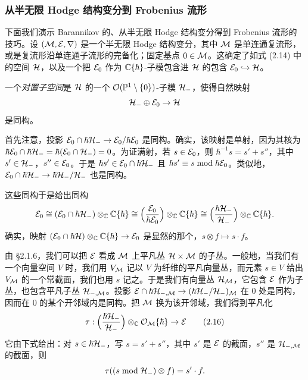 \subsubsection{从半无限 Hodge 结构变分到 Frobenius 流形}

下面我们演示 Barannikov 的、从半无限 Hodge 结构变分得到 Frobenius 流形的技巧。设 $(\mathcal{M},\mathcal{E},\nabla)$ 是一个半无限 Hodge 结构变分，其中 $\mathcal{M}$ 是单连通复流形，或是复流形沿单连通子流形的完备化；固定基点 $0\in\mathcal{M}$。这确定了如式 (2.14) 中的空间 $\mathcal{H}$，以及一个把 $\mathcal{E}_0$ 作为 $\mathbb{C}\{\hbar\}$-子模包含进 $\mathcal{H}$ 的包含 $\mathcal{E}_0\hookrightarrow\mathcal{H}$。

一个\emph{对置子空间}是 $\mathcal{H}$ 的一个 $\mathcal{O}(\mathbb{P}^1\setminus\{0\})$-子模 $\mathcal{H}_-$，使得自然映射
\[
\mathcal{H}_-\oplus\mathcal{E}_0\to\mathcal{H}
\]
是同构。

首先注意，投影 $\mathcal{E}_0\cap\hbar\mathcal{H}_-\to\mathcal{E}_0/\hbar\mathcal{E}_0$ 是同构。确实，该映射是单射，因为其核为 $\hbar\mathcal{E}_0\cap\hbar\mathcal{H}_-=\hbar(\mathcal{E}_0\cap\mathcal{H}_-)=0$。为证满射，若 $s\in\mathcal{E}_0$，则 $\hbar^{-1}s=s'+s''$，其中 $s'\in\mathcal{H}_-$，$s''\in\mathcal{E}_0$。于是 $\hbar s'\in\mathcal{E}_0\cap\hbar\mathcal{H}_-$ 且 $\hbar s'\equiv s\bmod\hbar\mathcal{E}_0$。类似地，$\mathcal{E}_0\cap\hbar\mathcal{H}_-\to\hbar\mathcal{H}_-/\mathcal{H}_-$ 也是同构。

这些同构于是给出同构
\[
\mathcal{E}_0\cong(\mathcal{E}_0\cap\hbar\mathcal{H}_-)\otimes_{\mathbb{C}}\mathbb{C}\{\hbar\}\cong\Big(\frac{\mathcal{E}_0}{\hbar\mathcal{E}_0}\Big)\otimes_{\mathbb{C}}\mathbb{C}\{\hbar\}\cong\Big(\frac{\hbar\mathcal{H}_-}{\mathcal{H}_-}\Big)\otimes_{\mathbb{C}}\mathbb{C}\{\hbar\}.
\]
确实，映射 $(\mathcal{E}_0\cap\hbar\mathcal{H})\otimes_{\mathbb{C}}\mathbb{C}\{\hbar\}\to\mathcal{E}_0$ 是显然的那个，$s\otimes f\mapsto s\cdot f$。


由 §2.1.6，我们可以把 $\mathcal{E}$ 看成 $\mathcal{M}$ 上平凡丛 $\mathcal{H}\times\mathcal{M}$ 的子丛。一般地，当我们有一个向量空间 $V$ 时，我们用 $V_{\mathcal{M}}$ 记以 $V$ 为纤维的平凡向量丛，而元素 $s\in V$ 给出 $V_{\mathcal{M}}$ 的一个常截面，我们也用 $s$ 记之。于是我们有向量丛 $\mathcal{H}_{\mathcal{M}}$，它包含 $\mathcal{E}$ 作为子丛，也包含平凡子丛 $\mathcal{H}_{-,\mathcal{M}}$。投影 $\mathcal{E}\cap\hbar\mathcal{H}_{-,\mathcal{M}}\to(\hbar\mathcal{H}_-/\mathcal{H}_-)_{\mathcal{M}}$ 在 $0$ 处是同构，因而在 $0$ 的某个开邻域内是同构。把 $\mathcal{M}$ 换为该开邻域，我们得到平凡化
\begin{equation}
\tau:\Big(\frac{\hbar\mathcal{H}_-}{\mathcal{H}_-}\Big)\otimes_{\mathbb{C}}\mathcal{O}_{\mathcal{M}}\{\hbar\}\to\mathcal{E} \tag{2.16}
\end{equation}
它由下式给出：对 $s\in\hbar\mathcal{H}_-$，写 $s=s'+s''$，其中 $s'$ 是 $\mathcal{E}$ 的截面，$s''$ 是 $\mathcal{H}_{-,\mathcal{M}}$ 的截面，则
\[
\tau((s\bmod\mathcal{H}_-)\otimes f)=s'\cdot f.
\]

